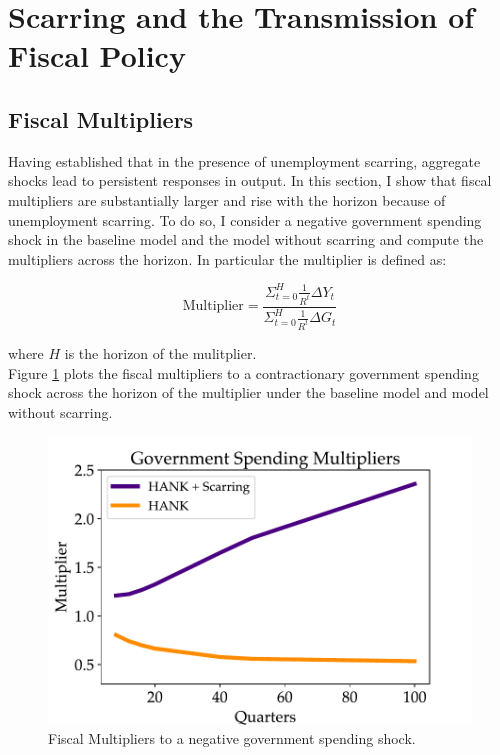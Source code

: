 \section{Scarring and the Transmission of Fiscal Policy}


\hypertarget{Fiscal Multipliers}{}
\subsection{Fiscal Multipliers}

Having established that in the presence of unemployment scarring, aggregate shocks lead to persistent responses in output. In this section, I show that fiscal multipliers are substantially larger and rise with the horizon because of unemployment scarring. To do so, I consider a negative government spending shock in the baseline model and the model without scarring and compute the multipliers across the horizon. In particular the multiplier is defined as:



$$ \text{Multiplier} = \frac{\Sigma_{t=0}^{H}  \frac{1}{R^{t}}\Delta Y_{t}}{ \Sigma_{t=0}^{H}  \frac{1}{R^{t}}\Delta{G_{t}}}$$ 

where $H$ is the horizon of the mulitplier. \\

Figure \ref{Fiscal_multipliers} plots the fiscal multipliers to a contractionary government spending shock across the horizon of the multiplier under the baseline model and model without scarring.


\begin{figure}[!ht]
    \centering
   \begin{minipage}{0.68\textwidth}
        \centering
        \includegraphics[scale=.7]{text/chapter1/Figures/multipliers} %
    \end{minipage}
        \caption{Fiscal Multipliers to a negative government spending shock.}
    \label{Fiscal_multipliers}
\end{figure}


